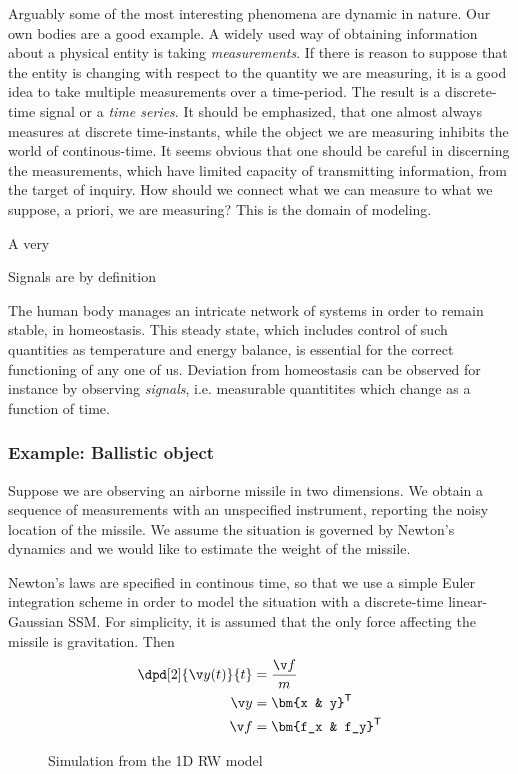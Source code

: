 Arguably some of the most interesting phenomena are dynamic in nature. 
Our own bodies are a good example. A widely used way of obtaining information
about a physical entity is taking \emph{measurements}. If there is reason
to suppose that the entity is changing with respect to the quantity
we are measuring, it is a good idea to take multiple measurements over
a time-period. The result is a discrete-time signal or a \emph{time series}.
It should be emphasized, that one almost always measures at discrete time-instants,
while the object we are measuring inhibits the world of continous-time.
It seems obvious that one should be careful in discerning the measurements,
which have limited capacity of transmitting information, from the target of inquiry.
How should we connect what we can measure to what we suppose, a priori, we are
measuring? This is the domain of modeling.

A very 


Signals are by definition 

The human body manages an intricate network of systems in order to remain
stable, in homeostasis. This steady state, which includes control of such quantities
as temperature and energy balance, is essential for the correct functioning of any one of us.
Deviation from homeostasis can be observed for instance by observing
\emph{signals}, i.e. measurable quantitites which change as a function of time.
 


\parencite{Murphy2002}
\subsubsection*{Example: Ballistic object}
Suppose we are observing an airborne missile in two dimensions.
We obtain a sequence of measurements with an unspecified instrument,
reporting the noisy location of the missile. We assume the situation
is governed by Newton's dynamics and we would like to estimate the weight
of the missile.

Newton's laws are specified in continous time, so that we use a simple
Euler integration scheme in order to model the situation with a discrete-time 
linear-Gaussian SSM. For simplicity, it is assumed that the only force affecting
the missile is gravitation. Then
\begin{align}
	\dpd[2]{\y(t)}{t} &= \frac{\f}{m}\\
	\y &= \bm{x & y}^\tr\\
	\f &= \bm{f_x & f_y}^\tr	
\end{align}

 
\begin{figure}[htp]
\begin{center}
  \caption{Simulation from the 1D RW model}
  \label{fig:rw1d}
\end{center}
\end{figure}
